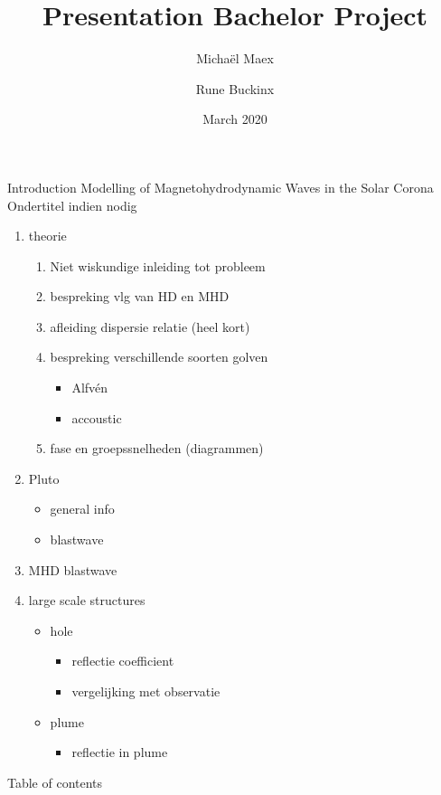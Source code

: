 \documentclass{beamer}
\title{Presentation Bachelor Project}
\author{\phantom{=}Micha\"el Maex \and Rune Buckinx }
\date{March 2020}
\begin{document}
\maketitle
\begin{frame}{Introduction} %
    \huge{Modelling of Magnetohydrodynamic Waves in the Solar Corona}\\
    \Large{Ondertitel indien nodig}
\end{frame}

\begin{frame}
	\begin{enumerate}
		\item theorie
			\begin{enumerate}
				\item Niet wiskundige inleiding tot probleem
				\item bespreking vlg van HD en MHD
				\item afleiding dispersie relatie (heel kort)
				\item bespreking verschillende soorten golven
					\begin{itemize}
						\item Alfv\'en
						\item accoustic
					\end{itemize}
				\item fase en groepssnelheden (diagrammen)
			\end{enumerate}
		\item Pluto
			\begin{itemize}
				\item general info
				\item blastwave
			\end{itemize}
		\item MHD blastwave
		\item large scale structures
			\begin{itemize}
				\item hole
					\begin{itemize}
						\item reflectie coefficient
						\item vergelijking met observatie
					\end{itemize}
				\item plume
					\begin{itemize}
						\item reflectie in plume 
					\end{itemize}
			\end{itemize}
	\end{enumerate}
\end{frame}
\begin{frame}{Table of contents}
    \tableofcontents
\end{frame}
\end{document}
